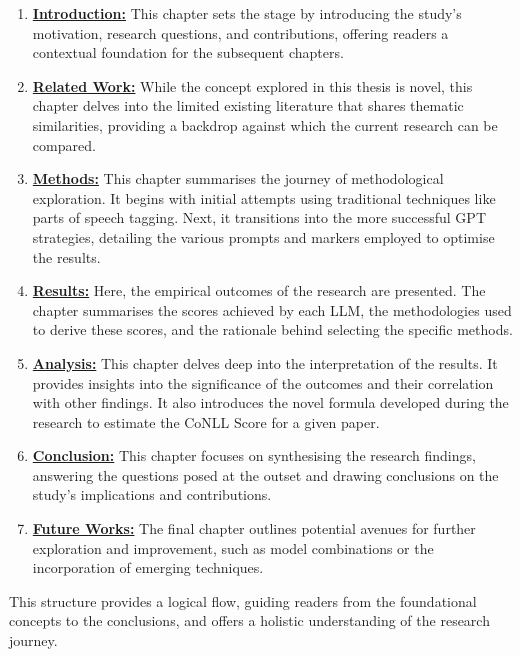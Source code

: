 \begin{enumerate}
    \item \textbf{\hyperref[chapter:introduction]{Introduction:}}  This chapter sets the stage by introducing the study's motivation, research questions, and contributions, offering readers a contextual foundation for the subsequent chapters.
    
    \item \textbf{\hyperref[chapter:related_work]{Related Work:}} While the concept explored in this thesis is novel, this chapter delves into the limited existing literature that shares thematic similarities, providing a backdrop against which the current research can be compared.
    
    \item \textbf{\hyperref[chapter:methods]{Methods:}} This chapter summarises the journey of methodological exploration. It begins with initial attempts using traditional techniques like parts of speech tagging. Next, it transitions into the more successful GPT strategies, detailing the various prompts and markers employed to optimise the results.
    
    \item \textbf{\hyperref[chapter:results]{Results:}} Here, the empirical outcomes of the research are presented. The chapter summarises the scores achieved by each LLM, the methodologies used to derive these scores, and the rationale behind selecting the specific methods.
    
    \item \textbf{\hyperref[chapter:analysis]{Analysis:}} This chapter delves deep into the interpretation of the results. It provides insights into the significance of the outcomes and their correlation with other findings. It also introduces the novel formula developed during the research to estimate the CoNLL Score for a given paper. %
    
    \item \textbf{\hyperref[chapter:conclusion]{Conclusion:}} This chapter focuses on synthesising the research findings, answering the questions posed at the outset and drawing conclusions on the study's implications and contributions.
    
    \item \textbf{\hyperref[chapter:future_works]{Future Works:}} The final chapter outlines potential avenues for further exploration and improvement, such as model combinations or the incorporation of emerging techniques.
    
    
\end{enumerate}

This structure provides a logical flow, guiding readers from the foundational concepts to the conclusions, and offers a holistic understanding of the research journey.

